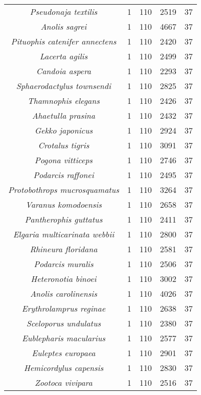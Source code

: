 \begin{longtable}[c]{|c|c|c|c|c|}
\textit{Pseudonaja textilis}           & 1 & 110 & 2519 & 37 \\
\textit{Anolis sagrei}                 & 1 & 110 & 4667 & 37 \\
\textit{Pituophis catenifer annectens} & 1 & 110 & 2420 & 37 \\
\textit{Lacerta agilis}                & 1 & 110 & 2499 & 37 \\
\textit{Candoia aspera}                & 1 & 110 & 2293 & 37 \\
\textit{Sphaerodactylus townsendi}     & 1 & 110 & 2825 & 37 \\
\textit{Thamnophis elegans}            & 1 & 110 & 2426 & 37 \\
\textit{Ahaetulla prasina}             & 1 & 110 & 2432 & 37 \\
\textit{Gekko japonicus}               & 1 & 110 & 2924 & 37 \\
\textit{Crotalus tigris}               & 1 & 110 & 3091 & 37 \\
\textit{Pogona vitticeps}              & 1 & 110 & 2746 & 37 \\
\textit{Podarcis raffonei}             & 1 & 110 & 2495 & 37 \\
\textit{Protobothrops mucrosquamatus}  & 1 & 110 & 3264 & 37 \\
\textit{Varanus komodoensis}           & 1 & 110 & 2658 & 37 \\
\textit{Pantherophis guttatus}         & 1 & 110 & 2411 & 37 \\
\textit{Elgaria multicarinata webbii}  & 1 & 110 & 2800 & 37 \\
\textit{Rhineura floridana}            & 1 & 110 & 2581 & 37 \\
\textit{Podarcis muralis}              & 1 & 110 & 2506 & 37 \\
\textit{Heteronotia binoei}            & 1 & 110 & 3002 & 37 \\
\textit{Anolis carolinensis}           & 1 & 110 & 4026 & 37 \\
\textit{Erythrolamprus reginae}        & 1 & 110 & 2638 & 37 \\
\textit{Sceloporus undulatus}          & 1 & 110 & 2380 & 37 \\
\textit{Eublepharis macularius}        & 1 & 110 & 2577 & 37 \\
\textit{Euleptes europaea}             & 1 & 110 & 2901 & 37 \\
\textit{Hemicordylus capensis}         & 1 & 110 & 2830 & 37 \\
\textit{Zootoca vivipara}              & 1 & 110 & 2516 & 37 \\ \hline
\end{longtable}


